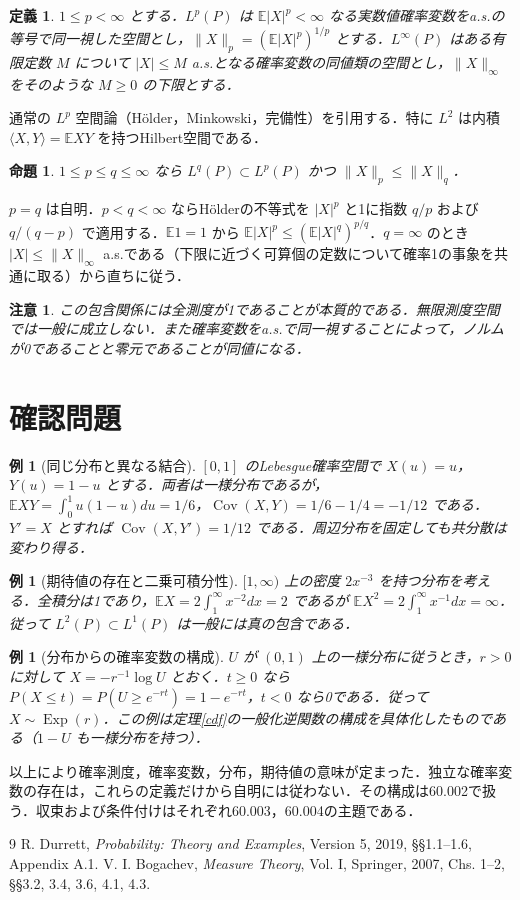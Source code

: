 \documentclass[a5paper,10pt,onecolumn]{jsarticle}
\makeatletter
\theoremstyle{mathnotetheorem}
\newtheorem{definition}[theorem]{定義}
\newtheorem{proposition}[theorem]{命題}
\newtheorem{example}[theorem]{例}
\newtheorem{remark}[theorem]{注意}
\renewcommand{\proofname}{証明}
\renewenvironment{proof}[1][\proofname]{%
  \par\pushQED{\qed}\normalfont\topsep4\p@\@plus2\p@\relax
  \trivlist\item[\hskip\labelsep\bfseries #1]\ignorespaces
}{\popQED\endtrivlist\@endpefalse}
\newcommand{\norm}[1]{\lVert #1\rVert}
\newcommand{\E}{\mathbb E}
\newcommand{\1}{\mathbf{1}}
\DeclareMathOperator{\Cov}{Cov}
\makeatother
\begin{document}
\begin{definition}
$1\le p<\infty$ とする．$L^p(P)$ は $\E|X|^p<\infty$ なる実数値確率変数をa.s.の等号で同一視した空間とし，$\norm{X}_p=(\E|X|^p)^{1/p}$ とする．$L^\infty(P)$ はある有限定数 $M$ について $|X|\le M$ a.s.となる確率変数の同値類の空間とし，$\norm{X}_\infty$ をそのような $M\ge0$ の下限とする．
\end{definition}
通常の $L^p$ 空間論（H\"older，Minkowski，完備性）を引用する．特に $L^2$ は内積 $\langle X,Y\rangle=\E XY$ を持つHilbert空間である．
\begin{proposition}
$1\le p\le q\le\infty$ なら $L^q(P)\subset L^p(P)$ かつ $\norm{X}_p\le\norm{X}_q$．
\end{proposition}
\begin{proof}
$p=q$ は自明．$p<q<\infty$ ならH\"olderの不等式を $|X|^p$ と1に指数 $q/p$ および $q/(q-p)$ で適用する．$\E1=1$ から $\E|X|^p\le(\E|X|^q)^{p/q}$．$q=\infty$ のとき $|X|\le\norm X_\infty$ a.s.である（下限に近づく可算個の定数について確率1の事象を共通に取る）から直ちに従う．
\end{proof}
\begin{remark}
この包含関係には全測度が1であることが本質的である．無限測度空間では一般に成立しない．また確率変数をa.s.で同一視することによって，ノルムが0であることと零元であることが同値になる．
\end{remark}

\section{確認問題}
\begin{example}[同じ分布と異なる結合]
$[0,1]$ のLebesgue確率空間で $X(u)=u$，$Y(u)=1-u$ とする．両者は一様分布であるが，$\E XY=\int_0^1u(1-u)du=1/6$，$\Cov(X,Y)=1/6-1/4=-1/12$ である．$Y'=X$ とすれば $\Cov(X,Y')=1/12$ である．周辺分布を固定しても共分散は変わり得る．
\end{example}
\begin{example}[期待値の存在と二乗可積分性]
$[1,\infty)$ 上の密度 $2x^{-3}$ を持つ分布を考える．全積分は1であり，$\E X=2\int_1^\infty x^{-2}dx=2$ であるが $\E X^2=2\int_1^\infty x^{-1}dx=\infty$．従って $L^2(P)\subset L^1(P)$ は一般には真の包含である．
\end{example}
\begin{example}[分布からの確率変数の構成]
$U$ が $(0,1)$ 上の一様分布に従うとき，$r>0$ に対して $X=-r^{-1}\log U$ とおく．$t\ge0$ なら $P(X\le t)=P(U\ge e^{-rt})=1-e^{-rt}$，$t<0$ なら0である．従って $X\sim\operatorname{Exp}(r)$．この例は定理\ref{cdf}の一般化逆関数の構成を具体化したものである（$1-U$ も一様分布を持つ）．
\end{example}
以上により確率測度，確率変数，分布，期待値の意味が定まった．独立な確率変数の存在は，これらの定義だけから自明には従わない．その構成は60.002で扱う．収束および条件付けはそれぞれ60.003，60.004の主題である．
\begin{thebibliography}{9}
 R. Durrett, \textit{Probability: Theory and Examples}, Version 5, 2019, \S\S1.1--1.6, Appendix A.1.
 V. I. Bogachev, \textit{Measure Theory}, Vol. I, Springer, 2007, Chs. 1--2, \S\S3.2, 3.4, 3.6, 4.1, 4.3.
\end{thebibliography}
\end{document}
